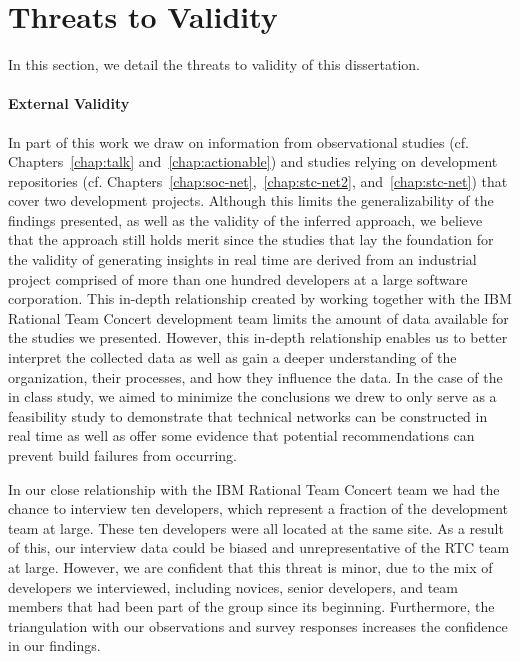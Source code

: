 \section{Threats to Validity}
\label{sec:threat}
In this section, we detail the threats to validity of this dissertation.

\paragraph{External Validity}
In part of this work we draw on information from observational studies (cf. Chapters~\ref{chap:talk} and~\ref{chap:actionable}) and studies relying on development repositories (cf. Chapters~\ref{chap:soc-net},~\ref{chap:stc-net2}, and~\ref{chap:stc-net}) that cover two development projects.
Although this limits the generalizability of the findings presented, as well as the validity of the inferred approach, we believe that the approach still holds merit since the studies that lay the foundation for the validity of generating insights in real time are derived from an industrial project comprised of more than one hundred developers at a large software corporation.
This in-depth relationship created by working together with the IBM Rational Team Concert development team limits the amount of data available for the studies we presented.
However, this in-depth relationship enables us to better interpret the collected data as well as gain a deeper understanding of the organization, their processes, and how they influence the data.
In the case of the in class study, we aimed to minimize the conclusions we drew to only serve as a feasibility study to demonstrate that technical networks can be constructed in real time as well as offer some evidence that potential recommendations can prevent build failures from occurring.

In our close relationship with the IBM Rational Team Concert team we had the chance to interview ten developers, which represent a fraction of the development team at large. These ten developers were all located at the same site. As a result of this, our interview data could be biased and unrepresentative of the RTC team at large.
However, we are confident that this threat is minor, due to the mix of developers we interviewed, including novices, senior developers, and team members that had been part of the group since its beginning.
Furthermore, the triangulation with our observations and survey responses increases the confidence in our findings.

